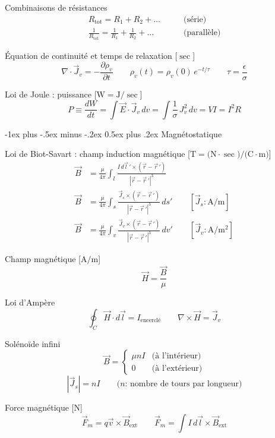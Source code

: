 \documentclass[10pt,landscape]{article}
\makeatletter
\renewcommand{\section}{\@startsection{section}{1}{0mm}%
                                {-1ex plus -.5ex minus -.2ex}%
                                {0.5ex plus .2ex}%
                                {\normalfont\large\bfseries}}
\newcommand{\extraline}{\vspace{1em}}
\makeatother
\begin{document}
\begin{multicols}{3}
\extraline
Combinaisons de résistances
\begin{align*}
R_\text{tot} = R_1 + R_2 + \dots \qquad & \text{(série)} \\
\frac{1}{R_\text{tot}} = \frac{1}{R_1} + \frac{1}{R_2} + \dots \qquad & \text{(parallèle)}
\end{align*}

Équation de continuité et temps de relaxation [$\si{\sec}$]
\[ \nabla\cdot\vec{J}_v = -\frac{\partial\rho_v}{\partial t} 
\qquad
\rho_v(t) = \rho_v(0) \, e^{-t/\tau}
\qquad
\tau = \frac{\epsilon}{\sigma} \]

Loi de Joule : puissance [$\si{\watt} = \si{\joule}/\si{\sec}$]
\[ P 
\equiv \frac{dW}{dt}
= \int \vec{E}\cdot \vec{J}_v \,dv 
= \int \frac{1}{\sigma}\, J_v^2\,dv
= VI = I^2 R\]


\hrulefill
\section{Magnétostatique}

Loi de Biot-Savart : champ induction magnétique [$\si{\tesla} = \si{(\newton\cdot\sec)/(\coulomb\cdot\metre)}$]
\begin{align*}
\vec{B} &= \frac{\mu}{4\pi} \int_l \frac{I\,d\vec{l}\,' \times(\vec{r}-\vec{r}\,')}{|\vec{r}-\vec{r}\,'|^3}
 \qquad  \\
\vec{B} &= \frac{\mu}{4\pi} \int_s \frac{\vec{J}_s \times(\vec{r}-\vec{r}\,')}{|\vec{r}-\vec{r}\,'|^3} \, ds'
\qquad [\vec{J}_s: \si{\ampere/\metre}] \\ 
\vec{B} &= \frac{\mu}{4\pi} \int_v \frac{\vec{J}_v \times(\vec{r}-\vec{r}\,')}{|\vec{r}-\vec{r}\,'|^3} \, dv'
\qquad [\vec{J}_v: \si{\ampere/\metre^2}]
\end{align*}

Champ magnétique [$\si{\ampere/\meter}$]
\[ \vec{H} = \frac{\vec{B}}{\mu} \]

Loi d'Ampère
\[ \oint_C \vec{H}\cdot d\vec{l} = I_\text{encerclé}
\qquad \nabla\times\vec{H} = \vec{J}_v   \]

Solénoïde infini
\[\vec{B} = 
\begin{cases} 
	\mu n I  & \text{(à l'intérieur)} \\
	0 & \text{(à l'extérieur)}
\end{cases}\]
\[ |\vec{J}_s | = nI \qquad \text{($n$: nombre de tours par longueur)} \]

\extraline
Force magnétique [\si{\newton}]
\[ \vec{F}_m = q\vec{v} \times \vec{B}_\text{ext} 
\qquad
\vec{F}_m = \int I\,d\vec{l} \times \vec{B}_\text{ext}  \]


\end{multicols}
\end{document}
